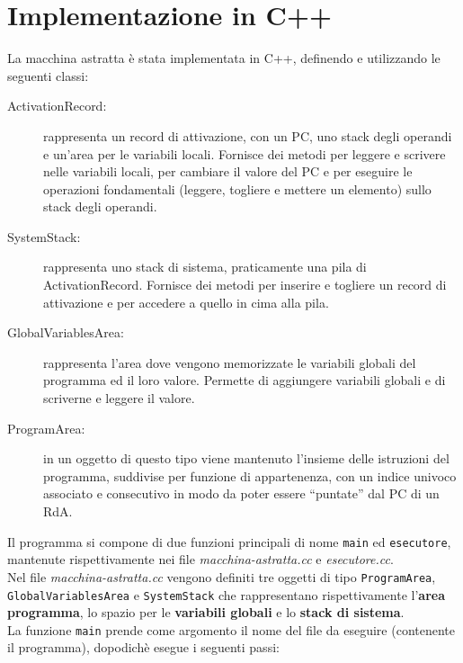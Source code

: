 \section{Implementazione in C++}
\label{sec:implementazione}
La macchina astratta \`e stata implementata in C++, definendo e utilizzando le seguenti classi:
\begin{description}
  \item[ActivationRecord:] rappresenta un record di attivazione, con un PC, uno stack degli operandi e un'area per le variabili locali. Fornisce dei metodi per leggere e scrivere nelle variabili locali, per cambiare il valore del PC e per eseguire le operazioni fondamentali (leggere, togliere e mettere un elemento) sullo stack degli operandi.
  \item[SystemStack:] rappresenta uno stack di sistema, praticamente una pila di ActivationRecord. Fornisce dei metodi per inserire e togliere un record di attivazione e per accedere a quello in cima alla pila.
  \item[GlobalVariablesArea:] rappresenta l'area dove vengono memorizzate le variabili globali del programma ed il loro valore. Permette di aggiungere variabili globali e di scriverne e leggere il valore.
  \item[ProgramArea:] in un oggetto di questo tipo viene mantenuto l'insieme delle istruzioni del programma, suddivise per funzione di appartenenza, con un indice univoco associato e consecutivo in modo da poter essere ``puntate'' dal PC di un RdA.
\end{description}
Il programma si compone di due funzioni principali di nome \texttt{main} ed \texttt{esecutore}, mantenute rispettivamente nei file \textit{macchina-astratta.cc} e \textit{esecutore.cc}.\\
Nel file \textit{macchina-astratta.cc} vengono definiti tre oggetti di tipo \texttt{ProgramArea}, \texttt{GlobalVariablesArea} e \texttt{SystemStack} che rappresentano rispettivamente l'\textbf{area programma}, lo spazio per le \textbf{variabili globali} e lo \textbf{stack di sistema}.\\
La funzione \texttt{main} prende come argomento il nome del file da eseguire (contenente il programma), dopodich\`e esegue i seguenti passi:
